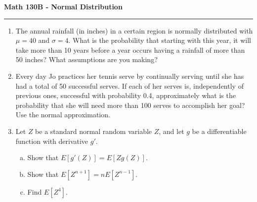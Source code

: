 \documentclass[11pt,letterpaper]{report}
\begin{document}
\begin{center}
{\bf \Large Math 130B - Normal Distribution}
\vspace{0.2cm}
\hrule
\end{center}

\begin{enumerate}
	\item The annual rainfall (in inches) in a certain region is normally distributed with $\mu = 40$ and $\sigma = 4$. What is the probability that starting with this year, it will take more than 10 years before a year occurs having a rainfall of more than 50 inches? What assumptions are you making?

	\vfill

	\item Every day Jo practices her tennis serve by continually serving until she has had a total of 50 successful serves. If each of her serves is, independently of previous ones, successful with probability 0.4, approximately what is the probability that she will need more than 100 serves to accomplish her goal? Use the normal approximation.

	\vfill

	\item Let $Z$ be a standard normal random variable $Z$, and let $g$ be a differentiable function with derivative $g'$.
	\begin{enumerate}[(a)]
		\item Show that $E[g'(Z)] = E[Zg(Z)]$.
		\item Show that $E[Z^{n+1}] = nE[Z^{n-1}]$.
		\item Find $E[Z^4]$.
	\end{enumerate}

	\vfill
\end{enumerate}	
\end{document}

